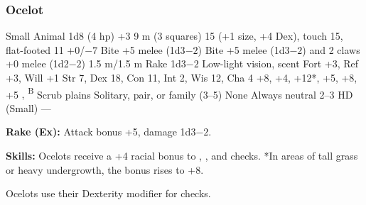 \subsubsection{Ocelot}
\begin{MonsterStats}
{Small Animal}
{1d8 (4 hp)}
{+3}
{9 m (3 squares)}
{15 (+1 size, +4 Dex), touch 15, flat-footed 11}
{+0/$-7$}
{Bite +5 melee (1d3$-2$)}
{Bite +5 melee (1d3$-2$) and 2 claws +0 melee (1d2$-2$)}
{1.5 m/1.5 m}
{Rake 1d3$-2$}
{Low-light vision, scent}
{Fort +3, Ref +3, Will +1}
{Str 7, Dex 18, Con 11, Int 2, Wis 12, Cha 4}
{ +8,  +4,  +12*,  +5,  +8,  +5}
{, \textsuperscript{B}}
{Scrub plains}
{Solitary, pair, or family (3--5)}
{\onehalf}
{None}
{Always neutral}
{2--3 HD (Small)}
{---}
\end{MonsterStats}

\textbf{Rake (Ex):} Attack bonus +5, damage 1d3$-2$.

\textbf{Skills:} Ocelots receive a +4 racial bonus to , , and  checks. *In areas of tall grass or heavy undergrowth, the  bonus rises to +8.

Ocelots use their Dexterity modifier for  checks.
